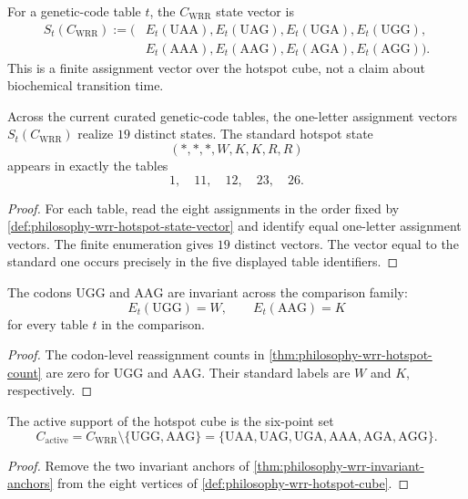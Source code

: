 \begin{definition}
\label{def:philosophy-wrr-hotspot-state-vector}
For a genetic-code table $t$, the $C_{\mathrm{WRR}}$ state vector is
$$
\begin{aligned}
  S_{t}(C_{\mathrm{WRR}})
  :=
  (&E_{t}(\mathrm{UAA}),
    E_{t}(\mathrm{UAG}),
    E_{t}(\mathrm{UGA}),
    E_{t}(\mathrm{UGG}),\\
   &E_{t}(\mathrm{AAA}),
    E_{t}(\mathrm{AAG}),
    E_{t}(\mathrm{AGA}),
    E_{t}(\mathrm{AGG})).
\end{aligned}
$$
This is a finite assignment vector over the hotspot cube, not a claim
about biochemical transition time.
\end{definition}

\begin{theorem}
\label{thm:philosophy-wrr-hotspot-state-spectrum}
Across the current curated genetic-code tables, the one-letter
assignment vectors $S_{t}(C_{\mathrm{WRR}})$ realize $19$ distinct
states. The standard hotspot state
$$
  (*,*,*,W,K,K,R,R)
$$
appears in exactly the tables
$$
  1,\quad 11,\quad 12,\quad 23,\quad 26.
$$
\end{theorem}
\begin{proof}
For each table, read the eight assignments in the order fixed by
\autoref{def:philosophy-wrr-hotspot-state-vector} and identify equal
one-letter assignment vectors. The finite enumeration gives $19$
distinct vectors. The vector equal to the standard one occurs precisely
in the five displayed table identifiers.
\end{proof}

\begin{theorem}
\label{thm:philosophy-wrr-invariant-anchors}
The codons $\mathrm{UGG}$ and $\mathrm{AAG}$ are invariant across the
comparison family:
$$
  E_{t}(\mathrm{UGG})=W,
  \qquad
  E_{t}(\mathrm{AAG})=K
$$
for every table $t$ in the comparison.
\end{theorem}
\begin{proof}
The codon-level reassignment counts in
\autoref{thm:philosophy-wrr-hotspot-count} are zero for $\mathrm{UGG}$
and $\mathrm{AAG}$. Their standard labels are $W$ and $K$, respectively.
\end{proof}

\begin{corollary}
\label{cor:philosophy-wrr-active-hotspot-support}
The active support of the hotspot cube is the six-point set
$$
  C_{\mathrm{active}}
  =
  C_{\mathrm{WRR}}\setminus\{\mathrm{UGG},\mathrm{AAG}\}
  =
  \{\mathrm{UAA},\mathrm{UAG},\mathrm{UGA},
    \mathrm{AAA},\mathrm{AGA},\mathrm{AGG}\}.
$$
\end{corollary}
\begin{proof}
Remove the two invariant anchors of
\autoref{thm:philosophy-wrr-invariant-anchors} from the eight vertices
of \autoref{def:philosophy-wrr-hotspot-cube}.
\end{proof}

